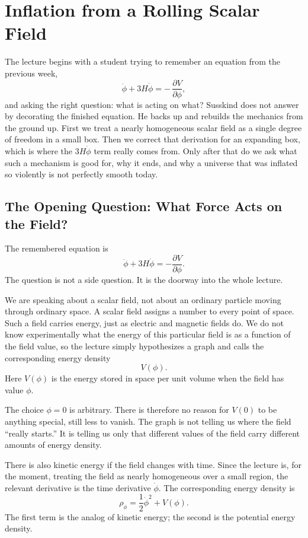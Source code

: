 \chapter{Inflation from a Rolling Scalar Field}

The lecture begins with a student trying to remember an equation from the previous week,
\[
\ddot{\phi}+3H\dot{\phi}=-\,\frac{\partial V}{\partial\phi},
\]
and asking the right question: what is acting on what? Susskind does not answer by decorating the finished equation. He backs up and rebuilds the mechanics from the ground up. First we treat a nearly homogeneous scalar field as a single degree of freedom in a small box. Then we correct that derivation for an expanding box, which is where the \(3H\dot\phi\) term really comes from. Only after that do we ask what such a mechanism is good for, why it ends, and why a universe that was inflated so violently is not perfectly smooth today.

\section{The Opening Question: What Force Acts on the Field?}

The remembered equation is
\begin{equation}
\ddot{\phi}+3H\dot{\phi}=-\frac{\partial V}{\partial \phi}.
\end{equation}
The question is not a side question. It is the doorway into the whole lecture.

We are speaking about a scalar field, not about an ordinary particle moving through ordinary space. A scalar field assigns a number to every point of space. Such a field carries energy, just as electric and magnetic fields do. We do not know experimentally what the energy of this particular field is as a function of the field value, so the lecture simply hypothesizes a graph and calls the corresponding energy density
\begin{equation}
V(\phi).
\end{equation}
Here \(V(\phi)\) is the energy stored in space per unit volume when the field has value \(\phi\).

The choice \(\phi=0\) is arbitrary. There is therefore no reason for \(V(0)\) to be anything special, still less to vanish. The graph is not telling us where the field ``really starts.'' It is telling us only that different values of the field carry different amounts of energy density.

There is also kinetic energy if the field changes with time. Since the lecture is, for the moment, treating the field as nearly homogeneous over a small region, the relevant derivative is the time derivative \(\dot\phi\). The corresponding energy density is
\begin{equation}
\rho_\phi=\frac{1}{2}\dot{\phi}^{2}+V(\phi).
\end{equation}
The first term is the analog of kinetic energy; the second is the potential energy density.

